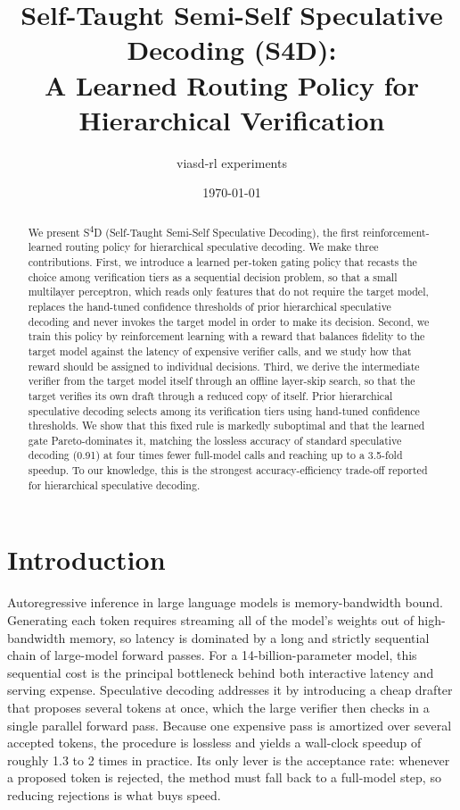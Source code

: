 \documentclass[11pt]{article}
\title{\textbf{Self-Taught Semi-Self Speculative Decoding (S4D):\\ A Learned Routing Policy for Hierarchical Verification}}
\author{viasd-rl experiments}
\date{\today}
\begin{document}
\maketitle

\begin{abstract}
We present S\textsuperscript{4}D (Self-Taught Semi-Self Speculative Decoding), the first
reinforcement-learned routing policy for hierarchical speculative decoding. We make three
contributions. First, we introduce a learned per-token gating policy that recasts the choice among
verification tiers as a sequential decision problem, so that a small multilayer perceptron, which
reads only features that do not require the target model, replaces the hand-tuned confidence
thresholds of prior hierarchical speculative decoding and never invokes the target model in order to
make its decision. Second, we train this policy by reinforcement learning with a reward that balances
fidelity to the target model against the latency of expensive verifier calls, and we study how that
reward should be assigned to individual decisions. Third, we derive the intermediate verifier from
the target model itself through an offline layer-skip search, so that the target verifies its own
draft through a reduced copy of itself. Prior hierarchical speculative decoding selects among its
verification tiers using hand-tuned confidence thresholds. We show that this fixed rule is markedly
suboptimal and that the learned gate Pareto-dominates it, matching the lossless accuracy of standard
speculative decoding (0.91) at four times fewer full-model calls and reaching up to a 3.5-fold speedup.
To our knowledge, this is the strongest accuracy-efficiency trade-off reported for hierarchical
speculative decoding.
\end{abstract}

\section{Introduction}
Autoregressive inference in large language models is memory-bandwidth bound. Generating each token
requires streaming all of the model's weights out of high-bandwidth memory, so latency is dominated by
a long and strictly sequential chain of large-model forward passes. For a 14-billion-parameter model,
this sequential cost is the principal bottleneck behind both interactive latency and serving expense.
Speculative decoding addresses it by introducing a cheap drafter that proposes several tokens at once,
which the large verifier then checks in a single parallel forward pass. Because one expensive pass is
amortized over several accepted tokens, the procedure is lossless and yields a wall-clock speedup of
roughly 1.3 to 2 times in practice. Its only lever is the acceptance rate: whenever a proposed token is
rejected, the method must fall back to a full-model step, so reducing rejections is what buys speed.
\end{document}
